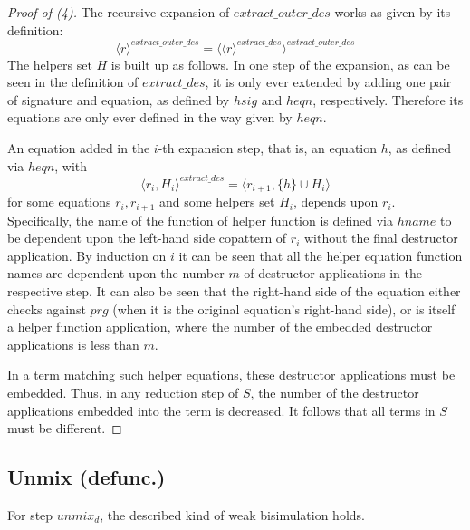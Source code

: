 \documentclass[11pt]{article} %
\begin{document}
\begin{proof}[Proof of (4)]
The recursive expansion of $extract\_outer\_des$ works as given by its definition:
\begin{equation*}
\langle r \rangle^{extract\_outer\_des} = \langle \langle r \rangle^{extract\_des} \rangle^{extract\_outer\_des}
\end{equation*}
The helpers set $H$ is built up as follows. In one step of the expansion, as can be seen in the definition of $extract\_des$, it is only ever extended by adding one pair of signature and equation, as defined by $hsig$ and $heqn$, respectively. Therefore its equations are only ever defined in the way given by $heqn$.

An equation added in the $i$-th expansion step, that is, an equation $h$, as defined via $heqn$, with
\begin{equation*}
\langle r_i, H_i \rangle^{extract\_des}  = \big\langle r_{i+1}, \{h\} \cup H_i \big\rangle
\end{equation*}
for some equations $r_i, r_{i+1}$ and some helpers set $H_i$, depends upon $r_i$. Specifically, the name of the function of helper function is defined via $hname$ to be dependent upon the left-hand side copattern of $r_i$ without the final destructor application. By induction on $i$ it can be seen that all the helper equation function names are dependent upon the number $m$ of destructor applications in the respective step. It can also be seen that the right-hand side of the equation either checks against $prg$ (when it is the original equation's right-hand side), or is itself a helper function application, where the number of the embedded destructor applications is less than $m$.

In a term matching such helper equations, these destructor applications must be embedded. Thus, in any reduction step of $S$, the number of the destructor applications embedded into the term is decreased. It follows that all terms in $S$ must be different.

\end{proof}

\subsection{Unmix (defunc.)}

For step $unmix_d$, the described kind of weak bisimulation holds.
\end{document}
